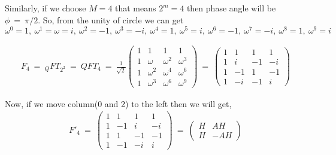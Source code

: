 \documentclass[a4paper,10pt]{article}
\begin{document}
Similarly, if we choose $M=4$ that means $2^m=4$ then phase angle will be $\phi\ =\ \pi/2$. So, from the unity of circle we can get 
$\omega^0=1,\ \omega^1=\omega=i,\ \omega^2=-1,\ \omega^3=-i,\ \omega^4=1,\ \omega^5=i,\ \omega^6=-1,\ \omega^7=-i,\ \omega^8=1,\ \omega^9=i$

\begin{eqnarray*}
F_4\ =\ _QFT_{2^2}\ =\ QFT_{4}\ =\ \frac{1}{\sqrt{2}}
\begin{pmatrix}
 1 & 1 & 1 & 1 \\
 1 & \omega & \omega^2 & \omega^3 \\
 1 & \omega^2 & \omega^4 & \omega^6 \\
 1 & \omega^3 & \omega^6 & \omega^9
\end{pmatrix}
\ =\ 
\begin{pmatrix}
  1 & 1 & 1 & 1 \\
  1 & i & -1 & -i \\
  1 & -1 & 1 & -1 \\
  1 & -i & -1 & i 
\end{pmatrix}
\end{eqnarray*}

Now, if we move column(0 and 2) to the left then we will get,
\begin{eqnarray*}
F'_4\ =\
\begin{pmatrix}
  1 & 1 & 1 & 1 \\
  1 & -1 & i & -i \\
  1 & 1 & -1 & -1 \\
  1 & -1 & -i & i 
\end{pmatrix}
\ =\ 
\begin{pmatrix}
 H & AH \\
 H & -AH
\end{pmatrix}
\end{eqnarray*}
\end{document}
